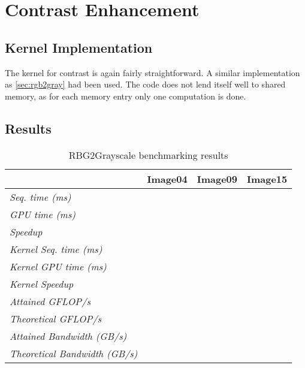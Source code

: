 \documentclass[final]{report}
\begin{document}
\chapter{Contrast Enhancement}

\section{Kernel Implementation}
The kernel for contrast is again fairly straightforward.
A similar implementation as \cref{sec:rgb2gray} had been used.
The code does not lend itself well to shared memory, as for each memory entry only one computation is done.

\section{Results}
\begin{table}[H]
	\centering
	\caption{RBG2Grayscale benchmarking results}
	\label{tab:rgb2grayscale-results}
	\begin{tabular}{llll}
	\toprule
											& \textbf{Image04} 	& \textbf{Image09} & \textbf{Image15} \\
	\midrule
	\textit{Seq. time (ms)} 				& ~ 				& ~ 				& ~ \\
	\textit{GPU time (ms)} 					& ~ 				& ~ 				& ~ \\
	\textit{Speedup} 						& ~ 				& ~ 				& ~ \\
	\midrule
	\textit{Kernel Seq. time (ms)} 			& ~ 				& ~ 				& ~ \\
	\textit{Kernel GPU time (ms)} 			& ~ 				& ~ 				& ~ \\
	\textit{Kernel Speedup} 				& ~ 				& ~ 				& ~ \\
	\midrule
	\textit{Attained GFLOP/s} 				& ~ 				& ~ 				& ~ \\
	\textit{Theoretical GFLOP/s} 			& ~ 				& ~ 				& ~ \\
	\textit{Attained Bandwidth (GB/s)}		& ~ 				& ~ 				& ~ \\
	\textit{Theoretical Bandwidth (GB/s)}	& ~ 				& ~ 				& ~ \\
	\bottomrule
	\end{tabular}
\end{table}

\end{document}
